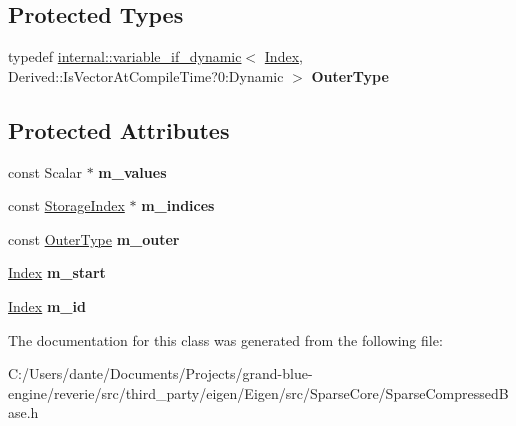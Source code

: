 \subsection*{Protected Types}
\begin{DoxyCompactItemize}
\item 
\mbox{\label{class_eigen_1_1_sparse_compressed_base_1_1_reverse_inner_iterator_a1a0ea3e7c5ad921e4d3de265e990ae90}} 
typedef \mbox{\hyperlink{class_eigen_1_1internal_1_1variable__if__dynamic}{internal\+::variable\+\_\+if\+\_\+dynamic}}$<$ \mbox{\hyperlink{struct_eigen_1_1_eigen_base_a554f30542cc2316add4b1ea0a492ff02}{Index}}, Derived\+::\+Is\+Vector\+At\+Compile\+Time?0\+:Dynamic $>$ {\bfseries Outer\+Type}
\end{DoxyCompactItemize}
\subsection*{Protected Attributes}
\begin{DoxyCompactItemize}
\item 
\mbox{\label{class_eigen_1_1_sparse_compressed_base_1_1_reverse_inner_iterator_ab4228f60b8c49d386589ebcbc185ab68}} 
const Scalar $\ast$ {\bfseries m\+\_\+values}
\item 
\mbox{\label{class_eigen_1_1_sparse_compressed_base_1_1_reverse_inner_iterator_a633e66cdf00c5eef9ae3b1c239767edf}} 
const \mbox{\hyperlink{class_eigen_1_1_sparse_matrix_base_a0b540ba724726ebe953f8c0df06081ed}{Storage\+Index}} $\ast$ {\bfseries m\+\_\+indices}
\item 
\mbox{\label{class_eigen_1_1_sparse_compressed_base_1_1_reverse_inner_iterator_ac648cf1165e7ad23f665990191910e40}} 
const \mbox{\hyperlink{class_eigen_1_1internal_1_1variable__if__dynamic}{Outer\+Type}} {\bfseries m\+\_\+outer}
\item 
\mbox{\label{class_eigen_1_1_sparse_compressed_base_1_1_reverse_inner_iterator_a9614e400ccaa3b7a6c864da414f0531e}} 
\mbox{\hyperlink{struct_eigen_1_1_eigen_base_a554f30542cc2316add4b1ea0a492ff02}{Index}} {\bfseries m\+\_\+start}
\item 
\mbox{\label{class_eigen_1_1_sparse_compressed_base_1_1_reverse_inner_iterator_a09af4445f7bdec54279184a310a7377a}} 
\mbox{\hyperlink{struct_eigen_1_1_eigen_base_a554f30542cc2316add4b1ea0a492ff02}{Index}} {\bfseries m\+\_\+id}
\end{DoxyCompactItemize}


The documentation for this class was generated from the following file\+:\begin{DoxyCompactItemize}
\item 
C\+:/\+Users/dante/\+Documents/\+Projects/grand-\/blue-\/engine/reverie/src/third\+\_\+party/eigen/\+Eigen/src/\+Sparse\+Core/Sparse\+Compressed\+Base.\+h\end{DoxyCompactItemize}
